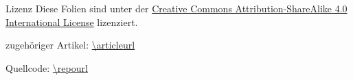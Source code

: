 
\begin{frame}{Lizenz}
    Diese Folien sind unter der
    \href{https://creativecommons.org/licenses/by-sa/4.0/}{Creative Commons
    Attribution-\allowbreak ShareAlike 4.0 International License} lizenziert.
    \ccbysa

    \vspace{1em}

    zugehöriger Artikel: \url{\articleurl}

    \vspace{1em}

    Quellcode: \url{\repourl}
\end{frame}
